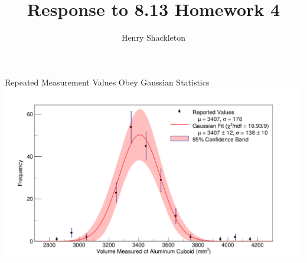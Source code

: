\documentclass{beamer}
\title[Response to 8.13 Homework 4]{Response to 8.13 Homework 4}
\author{Henry Shackleton}
\begin{document}
\begin{frame}{Repeated Measurement Values Obey Gaussian Statistics}
  \hspace*{-20pt}
  \includegraphics[width=14cm]{cubedata.png}
\end{frame}
\end{document}
